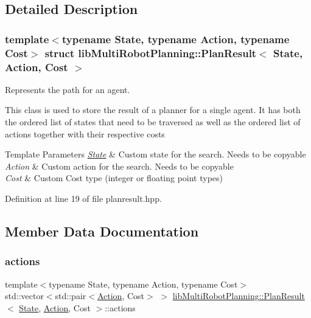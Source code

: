 \subsection{Detailed Description}
\subsubsection*{template$<$typename State, typename Action, typename Cost$>$\newline
struct lib\+Multi\+Robot\+Planning\+::\+Plan\+Result$<$ State, Action, Cost $>$}

Represents the path for an agent. 

This class is used to store the result of a planner for a single agent. It has both the ordered list of states that need to be traversed as well as the ordered list of actions together with their respective costs


\begin{DoxyTemplParams}{Template Parameters}
{\em \hyperlink{structlib_multi_robot_planning_1_1_state}{State}} & Custom state for the search. Needs to be copy\textquotesingle{}able \\
\hline
{\em Action} & Custom action for the search. Needs to be copy\textquotesingle{}able \\
\hline
{\em Cost} & Custom Cost type (integer or floating point types) \\
\hline
\end{DoxyTemplParams}


Definition at line 19 of file planresult.\+hpp.



\subsection{Member Data Documentation}
\mbox{\label{structlib_multi_robot_planning_1_1_plan_result_aa868b92b5c742f6c662e69779fbd09a4}} 
\subsubsection{\texorpdfstring{actions}{actions}}
{\footnotesize\ttfamily template$<$typename State, typename Action, typename Cost$>$ \\
std\+::vector$<$std\+::pair$<$\hyperlink{namespacelib_multi_robot_planning_aba73fb71693f86a324adfa0e41e1053d}{Action}, Cost$>$ $>$ \hyperlink{structlib_multi_robot_planning_1_1_plan_result}{lib\+Multi\+Robot\+Planning\+::\+Plan\+Result}$<$ \hyperlink{structlib_multi_robot_planning_1_1_state}{State}, \hyperlink{namespacelib_multi_robot_planning_aba73fb71693f86a324adfa0e41e1053d}{Action}, Cost $>$\+::actions}



